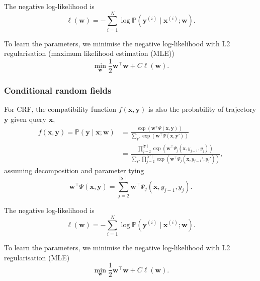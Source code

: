 \documentclass[twocolumn,9pt]{extarticle}
\begin{document}
The negative log-likelihood is 
\begin{equation*}
\ell(\mathbf{w}) = -\sum_{i=1}^N \log \mathbb{P}(\mathbf{y}^{(i)} \mid \mathbf{x}^{(i)}; \mathbf{w}).
\end{equation*}

To learn the parameters, we minimise the negative log-likelihood with L2 regularisation (maximum likelihood estimation (MLE))
\begin{equation*}
\min_{\mathbf{w}} \frac{1}{2} \mathbf{w}^\top \mathbf{w} + C \ell(\mathbf{w}).
\end{equation*}


\subsubsection{Conditional random fields}
\label{sec:crf}

For CRF, the compatibility function $f(\mathbf{x}, \mathbf{y})$ is also the probability of trajectory $\mathbf{y}$ given query $\mathbf{x}$,
\begin{align*}
f(\mathbf{x}, \mathbf{y}) = \mathbb{P}(\mathbf{y} \mid \mathbf{x}; \mathbf{w}) 
&= \frac{\exp \left( \mathbf{w}^\top \Psi(\mathbf{x}, \mathbf{y}) \right)}
        {\sum_{\mathbf{y}'} \exp \left( \mathbf{w}^\top \Psi(\mathbf{x}, \mathbf{y}') \right)} \\
&= \frac{\prod_{j=2}^{\mid \mathbf{y} \mid} \exp \left( \mathbf{w}^\top \Psi_j(\mathbf{x}, y_{j-1}, y_j) \right)}
       {\sum_{\mathbf{y}'} \prod_{j=2}^{\mid \mathbf{y}' \mid} \exp \left( \mathbf{w}^\top \Psi_j(\mathbf{x}, y_{j-1}', y_j') \right)},
\end{align*}
assuming decomposition and parameter tying
\begin{equation*}
\mathbf{w}^\top \Psi(\mathbf{x}, \mathbf{y}) = \sum_{j=2}^{\mid \mathbf{y} \mid} \mathbf{w}^\top \Psi_j(\mathbf{x}, y_{j-1}, y_j).
\end{equation*}

The negative log-likelihood is 
\begin{equation*}
\ell(\mathbf{w}) = -\sum_{i=1}^N \log \mathbb{P}(\mathbf{y}^{(i)} \mid \mathbf{x}^{(i)}; \mathbf{w}).
\end{equation*}

To learn the parameters, we minimise the negative log-likelihood with L2 regularisation (MLE)
\begin{equation*}
\min_{\mathbf{w}} \frac{1}{2} \mathbf{w}^\top \mathbf{w} + C \ell(\mathbf{w}).
\end{equation*}
\end{document}
